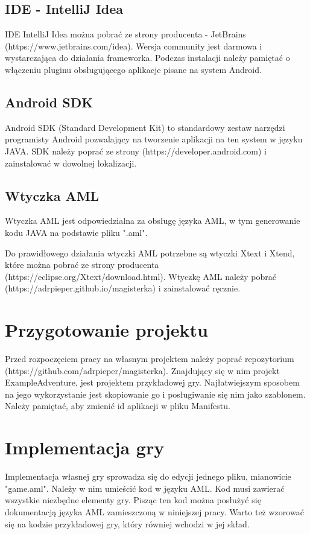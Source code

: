 \documentclass{xmgr}
\begin{document}
\subsection{IDE - IntelliJ Idea}

IDE IntelliJ Idea można pobrać ze strony producenta - JetBrains (https://www.jetbrains.com/idea). Wersja community jest darmowa i wystarczająca do działania frameworka. Podczas instalacji należy pamiętać o włączeniu pluginu obsługującego aplikacje pisane na system Android.

\subsection{Android SDK}

Android SDK (Standard Development Kit) to standardowy zestaw narzędzi programisty Android pozwalający na tworzenie aplikacji na ten system w języku JAVA. SDK należy poprać ze strony (https://developer.android.com) i zainstalować w dowolnej lokalizacji.

\subsection{Wtyczka AML}
Wtyczka AML jest odpowiedzialna za obsługę języka AML, w tym generowanie kodu JAVA na podstawie pliku ".aml". 

Do prawidłowego działania wtyczki AML potrzebne są wtyczki Xtext i Xtend, które można pobrać ze strony producenta (https://eclipse.org/Xtext/download.html).
Wtyczkę AML należy pobrać (https://adrpieper.github.io/magisterka) i zainstalować ręcznie.

\section{Przygotowanie projektu}
Przed rozpoczęciem pracy na własnym projektem należy poprać repozytorium (https://github.com/adrpieper/magisterka). Znajdujący się w nim projekt ExampleAdventure, jest projektem przykładowej gry. Najłatwiejszym sposobem na jego wykorzystanie jest skopiowanie go i posługiwanie się nim jako szablonem. Należy pamiętać, aby zmienić id aplikacji w pliku Manifestu.

\section{Implementacja gry}
Implementacja własnej gry sprowadza się do edycji jednego pliku, mianowicie "game.aml". Należy w nim umieścić kod w języku AML. Kod musi  zawierać wszystkie niezbędne elementy gry. Pisząc ten kod można posłużyć się dokumentacją języka AML zamieszczoną w niniejszej pracy. Warto też wzorować się na kodzie przykładowej gry, który równiej wchodzi w jej skład.
\end{document}
